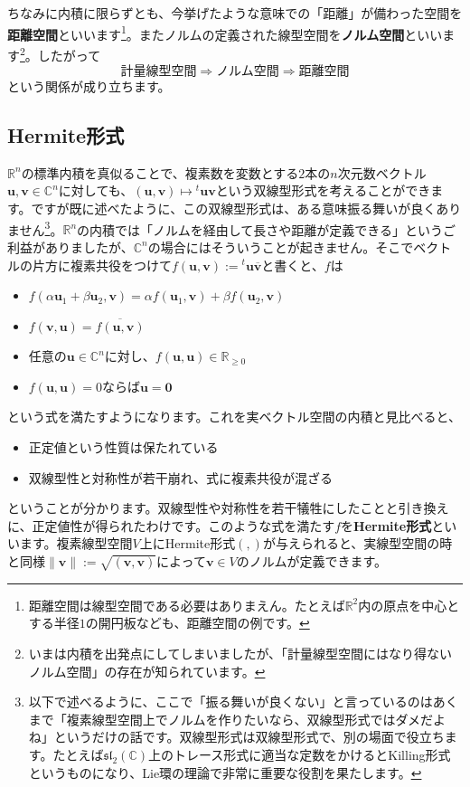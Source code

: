 ちなみに内積に限らずとも、今挙げたような意味での「距離」が備わった空間を\textbf{距離空間}といいます\footnote{距離空間は線型空間である必要はありまえん。たとえば$\mathbb{R}^2$内の原点を中心とする半径$1$の開円板なども、距離空間の例です。}。またノルムの定義された線型空間を\textbf{ノルム空間}といいます\footnote{いまは内積を出発点にしてしまいましたが、「計量線型空間にはなり得ないノルム空間」の存在が知られています。}。したがって
\[
\text{計量線型空間} \Longrightarrow
\text{ノルム空間} \Longrightarrow
\text{距離空間}
\]
という関係が成り立ちます。

\subsection{Hermite形式}

$\mathbb{R}^n$の標準内積を真似ることで、複素数を変数とする$2$本の$n$次元数ベクトル$\bm{u}, \bm{v} \in \mathbb{C}^n$に対しても、$(\bm{u}, \bm{v})\mapsto {}^t\bm{u} \bm{v}$という双線型形式を考えることができます。ですが既に述べたように、この双線型形式は、ある意味振る舞いが良くありません\footnote{以下で述べるように、ここで「振る舞いが良くない」と言っているのはあくまで「複素線型空間上でノルムを作りたいなら、双線型形式ではダメだよね」というだけの話です。双線型形式は双線型形式で、別の場面で役立ちます。たとえば$\mathfrak{sl}_2(\mathbb{C})$上のトレース形式に適当な定数をかけるとKilling形式というものになり、Lie環の理論で非常に重要な役割を果たします。}。$\mathbb{R}^n$の内積では「ノルムを経由して長さや距離が定義できる」というご利益がありましたが、$\mathbb{C}^n$の場合にはそういうことが起きません。そこでベクトルの片方に複素共役をつけて$f(\bm{u}, \bm{v}) := {}^t\bm{u}\overline{\bm{v}}$と書くと、$f$は
\begin{itemize}
\item $f(\alpha \bm{u}_1 + \beta \bm{u}_2, \bm{v}) = \alpha f(\bm{u}_1, \bm{v}) + \beta f(\bm{u}_2, \bm{v}) $
\item $f(\bm{v}, \bm{u}) = \overline{f(\bm{u}, \bm{v})}$
\item 任意の$\bm{u} \in \mathbb{C}^n$に対し、$f(\bm{u}, \bm{u}) \in \mathbb{R}_{\geq 0}$
\item $f(\bm{u}, \bm{u}) = 0$ならば$\bm{u} = \bm{0}$
\end{itemize}
という式を満たすようになります。これを実ベクトル空間の内積と見比べると、
\begin{itemize}
\item 正定値という性質は保たれている
\item 双線型性と対称性が若干崩れ、式に複素共役が混ざる
\end{itemize}
ということが分かります。双線型性や対称性を若干犠牲にしたことと引き換えに、正定値性が得られたわけです。このような式を満たす$f$を\textbf{Hermite形式}といいます。複素線型空間$V$上にHermite形式$(, )$が与えられると、実線型空間の時と同様$\|\bm{v}\| := \sqrt{(\bm{v}, \bm{v})}$によって$\bm{v} \in V$のノルムが定義できます。

